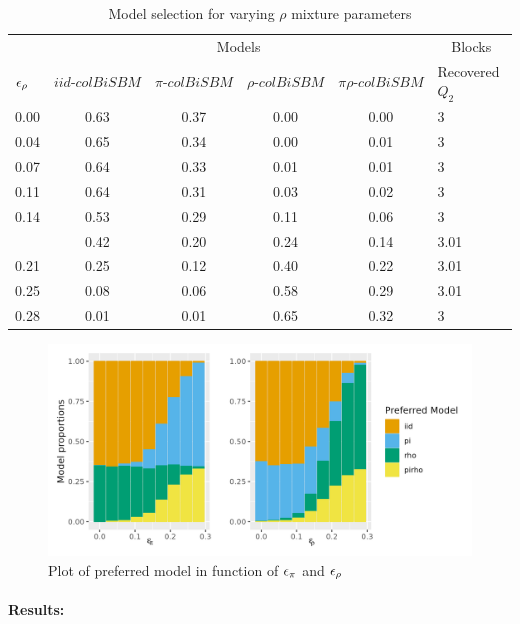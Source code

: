 \begin{table}[!h]

\caption{\label{tab:tables}\label{tab:rho-model-sel}Model selection for varying $\rho$ mixture parameters}
\centering
\begin{tabular}[t]{lccccl}
\toprule
\multicolumn{1}{c}{ } & \multicolumn{4}{c}{Models} & \multicolumn{1}{c}{Blocks} \\
\cmidrule(l{3pt}r{3pt}){2-5} \cmidrule(l{3pt}r{3pt}){6-6}
$\eps[\rho]$ & $iid\text{-}colBiSBM$     & $\pi\text{-}colBiSBM$ & $\rho\text{-}colBiSBM$ & $\pi\rho\text{-}colBiSBM$ & Recovered $Q_2$\\
\midrule
0.00 & 0.63 & 0.37 & 0.00 & 0.00 & 3\\
0.04 & 0.65 & 0.34 & 0.00 & 0.01 & 3\\
0.07 & 0.64 & 0.33 & 0.01 & 0.01 & 3\\
0.11 & 0.64 & 0.31 & 0.03 & 0.02 & 3\\
0.14 & 0.53 & 0.29 & 0.11 & 0.06 & 3\\
\addlinespace
0.18 & 0.42 & 0.20 & 0.24 & 0.14 & 3.01\\
0.21 & 0.25 & 0.12 & 0.40 & 0.22 & 3.01\\
0.25 & 0.08 & 0.06 & 0.58 & 0.29 & 3.01\\
0.28 & 0.01 & 0.01 & 0.65 & 0.32 & 3\\
\bottomrule
\end{tabular}
\end{table}

\begin{figure}[H]
\includegraphics{./Rcodes/simulation/img/plot_model_function_eps.png}
\caption{Plot of preferred model in function of $\eps[\pi]$ and $\eps[\rho]$}
\label{fig:pref_model_func_eps}
\end{figure}

\paragraph{Results:}


